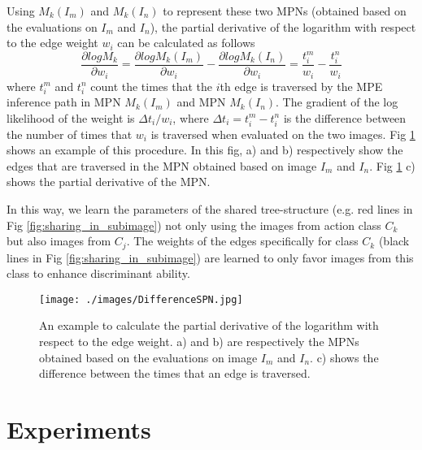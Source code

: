\documentclass[journal]{IEEEtran}
\begin{document}
Using $ M_k(I_m) $ and $ M_k(I_n) $ to represent these two MPNs (obtained based on the evaluations on $ I_m $ and $ I_n $), the partial derivative of the logarithm with respect to the edge weight $ w_i $ can be calculated as follows
\begin{equation}\label{derivateOfWeight}
\frac{\partial logM_k}{\partial {w_i}}=\frac{\partial logM_k(I_m)}{\partial {w_i}}-\frac{\partial logM_k(I_n)}{\partial {w_i}}=\dfrac{t_i^m}{w_i}-\dfrac{t_i^n}{w_i}
\end{equation}
where $ t_i^m $ and  $ t_i^n $ count the times that the $ i $th edge is traversed by the MPE inference path in MPN $ M_k(I_m) $ and MPN $ M_k(I_n) $. The gradient of the log likelihood of the weight is $ \Delta t_i/w_i $, where $ \Delta t_i=t_i^m-t_i^n $ is the difference between the number of times that $ w_i $ is traversed when evaluated on the two images. Fig \ref{fig:differenceSPN} shows an example of this procedure. In this fig, a) and b) respectively show the edges that are traversed in the MPN obtained based on image $ I_m $ and $ I_n $. Fig \ref{fig:differenceSPN} c) shows the partial derivative of the MPN.

In this way, we learn the parameters of the shared tree-structure (e.g. red lines in Fig \ref{fig:sharing_in_subimage}) not only using the images from action class $ C_k $ but also images from $ C_j $. The weights of the edges specifically for class $ C_k $ (black lines in Fig \ref{fig:sharing_in_subimage})   are learned to only favor images from this class to enhance discriminant ability.





\begin{figure}[htb]
	\begin{center}
		\texttt{[image: ./images/DifferenceSPN.jpg]}
	\end{center}
	\caption{An example to calculate the partial derivative of the logarithm with respect to the edge weight. a) and b) are respectively the MPNs obtained based on the evaluations on image $ I_m $ and $ I_n $. c) shows the difference between the times that an edge is traversed.}
	\label{fig:differenceSPN}
\end{figure}




\section{Experiments}
\label{Sec:experi}
\end{document}

